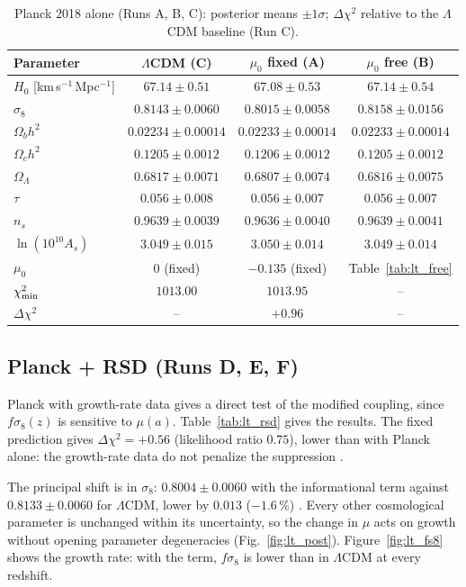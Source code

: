 \begin{table}[htbp]\centering\small
\caption{Planck 2018 alone (Runs A, B, C): posterior means $\pm1\sigma$; $\Delta\chi^2$ relative to the $\Lambda$CDM baseline (Run C). \measured}\label{tab:lt_planck}
\begin{tabular}{lccc}\hline
Parameter & $\Lambda$CDM (C) & $\mu_0$ fixed (A) & $\mu_0$ free (B)\\\hline
$H_0$ [km\,s$^{-1}$\,Mpc$^{-1}$] & $67.14\pm0.51$ & $67.08\pm0.53$ & $67.14\pm0.54$\\
$\sigma_8$ & $0.8143\pm0.0060$ & $0.8015\pm0.0058$ & $0.8158\pm0.0156$\\
$\Omega_bh^2$ & $0.02234\pm0.00014$ & $0.02233\pm0.00014$ & $0.02233\pm0.00014$\\
$\Omega_ch^2$ & $0.1205\pm0.0012$ & $0.1206\pm0.0012$ & $0.1205\pm0.0012$\\
$\Omega_\Lambda$ & $0.6817\pm0.0071$ & $0.6807\pm0.0074$ & $0.6816\pm0.0075$\\
$\tau$ & $0.056\pm0.008$ & $0.056\pm0.007$ & $0.056\pm0.007$\\
$n_s$ & $0.9639\pm0.0039$ & $0.9636\pm0.0040$ & $0.9639\pm0.0041$\\
$\ln(10^{10}A_s)$ & $3.049\pm0.015$ & $3.050\pm0.014$ & $3.049\pm0.014$\\
$\mu_0$ & 0 (fixed) & $-0.135$ (fixed) & Table~\ref{tab:lt_free}\\
$\chi^2_{\rm min}$ & $1013.00$ & $1013.95$ & --\\
$\Delta\chi^2$ & -- & $+0.96$ & --\\\hline
\end{tabular}\end{table}

\subsection{Planck + RSD (Runs D, E, F)}
Planck with growth-rate data gives a direct test of the modified coupling, since $f\sigma_8(z)$ is sensitive to $\mu(a)$. Table~\ref{tab:lt_rsd}
gives the results. The fixed prediction gives $\Delta\chi^2=+0.56$ (likelihood ratio $0.75$), lower than with Planck alone: the growth-rate data do
not penalize the suppression \measured.

The principal shift is in $\sigma_8$: $0.8004\pm0.0060$ with the informational term against $0.8133\pm0.0060$ for $\Lambda$CDM, lower by $0.013$
($-1.6\,\%$) \measured. Every other cosmological parameter is unchanged within its uncertainty, so the change in $\mu$ acts on growth without opening
parameter degeneracies (Fig.~\ref{fig:lt_post}). Figure~\ref{fig:lt_fs8} shows the growth rate: with the term, $f\sigma_8$ is lower than in
$\Lambda$CDM at every redshift.

